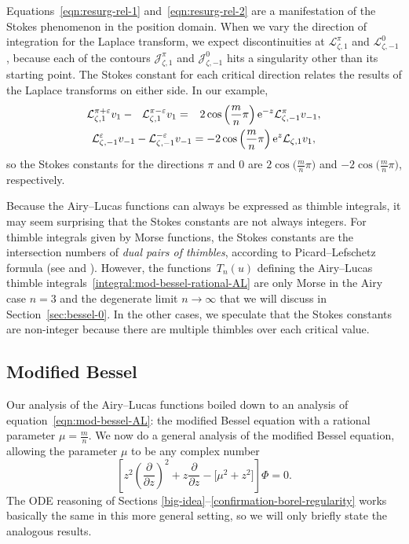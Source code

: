 \documentclass[pdftex]{sigma}
\newcommand{\laplace}{\mathcal{L}}
\numberwithin{equation}{section}
\begin{document}
Equations~\eqref{eqn:resurg-rel-1} and~\eqref{eqn:resurg-rel-2} are a manifestation of the Stokes phenomenon in the position domain. When we vary the direction of integration for the Laplace transform, we expect discontinuities at $\laplace^\pi_{\zeta,1}$ and $\laplace^0_{\zeta,-1}$, because each of the contours $\mathcal{J}^\pi_{\zeta,1}$ and $\mathcal{J}^0_{\zeta,-1}$ hits a singularity other than its starting point. The Stokes constant for each critical direction relates the results of the Laplace transforms on either side. In our example,
\begin{gather*}
\laplace_{\zeta,1}^{\pi+\varepsilon} v_1 - \hphantom{{}_{-}}\laplace_{\zeta,1}^{\pi-\varepsilon} v_1 = \hphantom{-}2\cos\left(\frac{m}{n}\pi\right) {\rm e}^{-z} \laplace_{\zeta,-1}^{\pi} v_{-1}, \\
\laplace_{\zeta,-1}^{\varepsilon} v_{-1} - \laplace_{\zeta,-1}^{-\varepsilon} v_{-1} = -2\cos\left(\frac{m}{n}\pi\right) {\rm e}^z \laplace_{\zeta,1} v_{1},
\end{gather*}
so the Stokes constants for the directions $\pi$ and $0$ are $2\cos\bigl(\frac{m}{n}\pi\bigr)$ and $-2\cos\bigl(\frac{m}{n}\pi\bigr)$, respectively.

Because the Airy--Lucas functions can always be expressed as thimble integrals, it may seem surprising that the Stokes constants are not always integers. For thimble integrals given by Morse functions, the Stokes constants are the intersection numbers of \textit{dual pairs of thimbles}, according to Picard--Lefschetz formula (see \cite[Section~5]{pham} and \cite[Chapter~1]{Arnold}). However, the functions~$T_n(u)$ defining the Airy--Lucas thimble integrals~\eqref{integral:mod-bessel-rational-AL} are only Morse in the Airy case $n = 3$ and the degenerate limit $n \to \infty$ that we will discuss in Section~\ref{sec:bessel-0}. In the other cases, we speculate that the Stokes constants are non-integer because there are multiple thimbles over each critical value.
\subsection{Modified Bessel}\label{sec:mod-bessel-lift}
Our analysis of the Airy--Lucas functions boiled down to an analysis of equation~\eqref{eqn:mod-bessel-AL}: the modified Bessel equation with a rational parameter $\mu = \frac{m}{n}$. We now do a general analysis of the modified Bessel equation, allowing the parameter $\mu$ to be any complex number
\begin{equation}\label{eqn:mod-bessel}
\left[z^2 \left(\frac{\partial}{\partial z}\right)^2 + z \frac{\partial}{\partial z} - \bigl[\mu^2 + z^2\bigr]\right] \Phi = 0.
\end{equation}
The ODE reasoning of Sections \ref{big-idea}--\ref{confirmation-borel-regularity} works basically the same in this more general setting, so we will only briefly state the analogous results.
\end{document}
